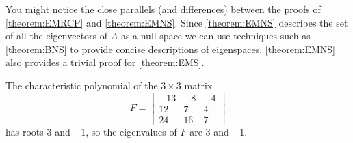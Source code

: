 \documentclass{ximera}
\begin{document}
You might notice the close parallels (and differences) between the
proofs of \ref{theorem:EMRCP} and \ref{theorem:EMNS}.  Since
\ref{theorem:EMNS} describes the set of all the eigenvectors of $A$ as
a null space we can use techniques such as \ref{theorem:BNS} to
provide concise descriptions of eigenspaces.  \ref{theorem:EMNS} also
provides a trivial proof for \ref{theorem:EMS}.

\begin{example}
  The characteristic polynomial of the $3\times 3$ matrix
  \[
    F=
    \begin{bmatrix}
      -13 & -8 & -4\\
      12 & 7 & 4\\
      24 & 16 & 7
    \end{bmatrix}
  \]
  has roots $3$ and $-1$, so the eigenvalues of $F$ are $3$ and $-1$.


\end{example}
\end{document}
